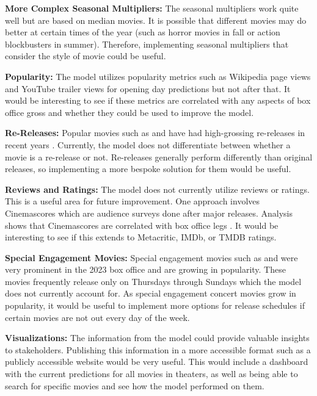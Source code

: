 \documentclass[12pt]{article}
\begin{document}
\textbf{More Complex Seasonal Multipliers:} The seasonal multipliers work quite well but are based on median movies. It is possible that different movies may do better at certain times of the year (such as horror movies in fall or action blockbusters in summer). Therefore, implementing seasonal multipliers that consider the style of movie could be useful.

\textbf{Popularity:} The model utilizes popularity metrics such as Wikipedia page views and YouTube trailer views for opening day predictions but not after that. It would be interesting to see if these metrics are correlated with any aspects of box office gross and whether they could be used to improve the model.

\textbf{Re-Releases:} Popular movies such as \cite{interstellar} and \cite{revengeOfTheSith} have had high-grossing re-releases in recent years \citep{interstellarReRelease, revengeOfTheSithReRelease}. Currently, the model does not differentiate between whether a movie is a re-release or not. Re-releases generally perform differently than original releases, so implementing a more bespoke solution for them would be useful.

\textbf{Reviews and Ratings:} The model does not currently utilize reviews or ratings. This is a useful area for future improvement. One approach involves Cinemascores which are audience surveys done after major releases. Analysis shows that Cinemascores are correlated with box office legs \citep{redditCinemascore}. It would be interesting to see if this extends to Metacritic, IMDb, or TMDB ratings.

\textbf{Special Engagement Movies:} Special engagement movies such as \cite{erasTour} and \cite{renaissance} were very prominent in the 2023 box office and are growing in popularity. These movies frequently release only on Thursdays through Sundays which the model does not currently account for. As special engagement concert movies grow in popularity, it would be useful to implement more options for release schedules if certain movies are not out every day of the week.

\textbf{Visualizations:} The information from the model could provide valuable insights to stakeholders. Publishing this information in a more accessible format such as a publicly accessible website would be very useful. This would include a dashboard with the current predictions for all movies in theaters, as well as being able to search for specific movies and see how the model performed on them.
\end{document}
